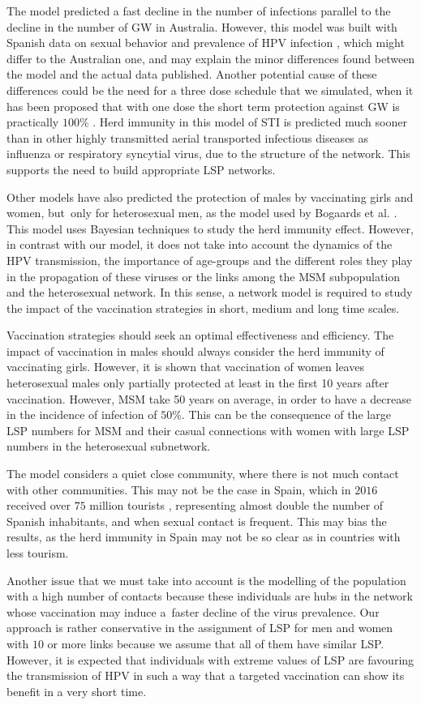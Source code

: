 The model predicted a fast decline in the number of infections parallel to the decline in the number of GW in Australia. However, this model was built with Spanish data on sexual behavior \cite{INE} and prevalence of HPV infection \cite{CLEOPATRE}, which might differ to the Australian one, and may explain the minor differences found between the model and the actual data published. Another potential cause of these differences could be the need for a three dose schedule that we simulated, when it has been proposed that with one dose the short term protection against GW is practically $100\%$ \cite{Ali}. Herd immunity in this model of STI is predicted much sooner than in other highly transmitted aerial transported infectious diseases as influenza or  {respiratory syncytial virus}, due to the structure of the network. This supports the need to build
appropriate LSP networks.

Other models have also predicted the protection of males by vaccinating girls and women, but~only for heterosexual men, as the model used by Bogaards et al. \cite{Bogaards}. This model uses Bayesian techniques to study the herd immunity effect. However, in contrast with our model, it does not take into account the dynamics of the HPV transmission, the importance of age-groups and the different roles they play in the propagation of these viruses or the links among the MSM subpopulation and the heterosexual network. In this sense, a network model is required to study the impact of the vaccination strategies in short, medium and long time scales.

Vaccination strategies should seek an optimal effectiveness and efficiency. The impact of vaccination in males should always consider the herd immunity of vaccinating girls. However, it is shown that vaccination of women leaves heterosexual males only partially protected at least in the first 10 years after vaccination. However, MSM take 50 years on average, in order to have a decrease in the incidence of infection of $50\%$. This can be the consequence of the large LSP numbers for MSM and their casual connections with women with large LSP numbers in the heterosexual subnetwork.

The model considers a quiet close community, where there is not much contact with other communities. This may not be the case in Spain, which in $2016$ received over $75$ million tourists \cite{INE2}, representing almost double the number of Spanish inhabitants, and when sexual contact is frequent. This may bias the results, as the herd immunity in Spain may not be so clear as in countries with less tourism.

Another issue that we must take into account is the modelling of the population with a high number of contacts because these
individuals are hubs in the network whose vaccination may induce a~faster decline of the virus prevalence. Our approach is rather conservative in the assignment of LSP for men and women with $10$ or more links because we assume that all of them have similar LSP. However, it is expected that individuals with extreme values of LSP are favouring the transmission of HPV in such a way that a targeted vaccination can show its benefit in a very short time.
